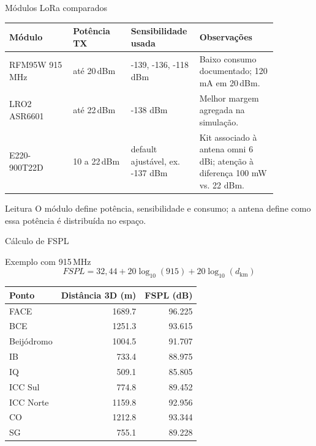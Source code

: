 \documentclass[aspectratio=169]{beamer}
\newcommand{\SI}[2]{#1\,#2}
\begin{document}
\begin{frame}{Módulos LoRa comparados}
\small
\begin{table}
\centering
\scriptsize
\begin{tabular}{p{0.22\linewidth}p{0.20\linewidth}p{0.18\linewidth}p{0.27\linewidth}}
\toprule
Módulo & Potência TX & Sensibilidade usada & Observações \\
\midrule
RFM95W 915 MHz & até \SI{20}{dBm} & -139, -136, -118 dBm & Baixo consumo documentado; \SI{120}{mA} em \SI{20}{dBm}. \\
LRO2 ASR6601 & até \SI{22}{dBm} & -138 dBm & Melhor margem agregada na simulação. \\
E220-900T22D & 10 a \SI{22}{dBm} & default ajustável, ex. -137 dBm & Kit associado à antena omni \SI{6}{dBi}; atenção à diferença 100 mW vs. 22 dBm. \\
\bottomrule
\end{tabular}
\end{table}
\begin{block}{Leitura}
O módulo define potência, sensibilidade e consumo; a antena define como essa potência é distribuída no espaço.
\end{block}
\end{frame}

\begin{frame}{Cálculo de FSPL}
\small
\begin{block}{Exemplo com \SI{915}{MHz}}
\[
FSPL = 32{,}44 + 20\log_{10}(915) + 20\log_{10}(d_{\mathrm{km}})
\]
\end{block}
\begin{table}
\centering
\scriptsize
\begin{tabular}{lrr}
\toprule
Ponto & Distância 3D (m) & FSPL (dB) \\
\midrule
FACE & 1689.7 & 96.225 \\
BCE & 1251.3 & 93.615 \\
Beijódromo & 1004.5 & 91.707 \\
IB & 733.4 & 88.975 \\
IQ & 509.1 & 85.805 \\
ICC Sul & 774.8 & 89.452 \\
ICC Norte & 1159.8 & 92.956 \\
CO & 1212.8 & 93.344 \\
SG & 755.1 & 89.228 \\
\bottomrule
\end{tabular}
\end{table}
\end{frame}
\end{document}

